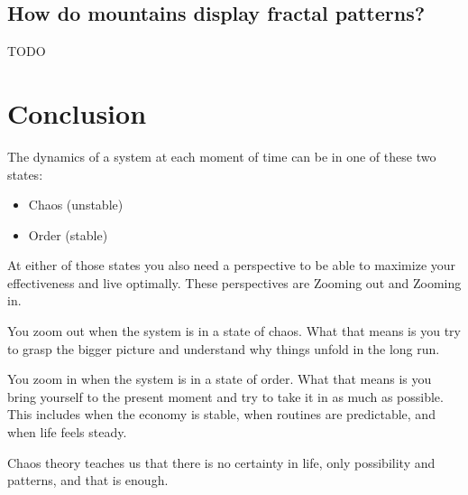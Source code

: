 \documentclass[12pt]{article}
\begin{document}
\subsection{How do mountains display fractal patterns?}
TODO

\section{Conclusion}

The dynamics of a system at each moment of time can be in one of these two states:
\begin{itemize}
    \item Chaos (unstable)
    \item Order (stable)
\end{itemize}


At either of those states you also need a perspective to be able to maximize your effectiveness and live optimally. These perspectives are Zooming out and Zooming in. 

You zoom out when the system is in a state of chaos. What that means is you try to grasp the bigger picture and understand why things unfold in the long run.

You zoom in when the system is in a state of order. What that means is you bring yourself to the present moment and try to take it in as much as possible. This includes when the economy is stable, when routines are predictable, and when life feels steady.

Chaos theory teaches us that there is no certainty in life, only possibility and patterns, and that is enough.


\nocite{*} 
 

\end{document}
